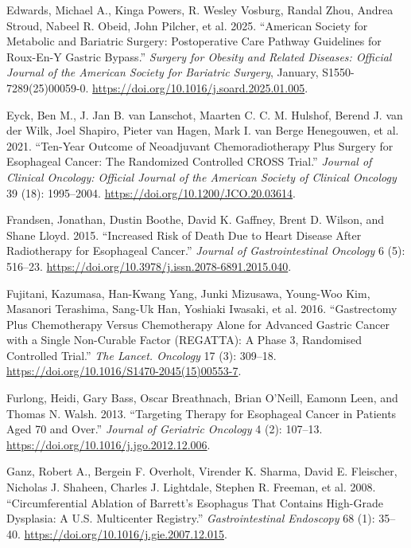 \documentclass[
  letterpaper,
]{scrbook}
\newlength{\cslhangindent}
\newenvironment{CSLReferences}[2] %
 {\begin{list}{}{%
  \setlength{\itemindent}{0pt}
  \setlength{\leftmargin}{0pt}
  \setlength{\parsep}{0pt}
  \ifodd #1
   \setlength{\leftmargin}{\cslhangindent}
   \setlength{\itemindent}{-1\cslhangindent}
  \fi
  \setlength{\itemsep}{#2\baselineskip}}}
 {\end{list}}
\begin{document}
\begin{CSLReferences}{1}{0}
Edwards, Michael A., Kinga Powers, R. Wesley Vosburg, Randal Zhou,
Andrea Stroud, Nabeel R. Obeid, John Pilcher, et al. 2025. {``American
{Society} for {Metabolic} and {Bariatric} {Surgery}: Postoperative Care
Pathway Guidelines for {Roux}-En-{Y} Gastric Bypass.''} \emph{Surgery
for Obesity and Related Diseases: Official Journal of the American
Society for Bariatric Surgery}, January, S1550-7289(25)00059-0.
\url{https://doi.org/10.1016/j.soard.2025.01.005}.

Eyck, Ben M., J. Jan B. van Lanschot, Maarten C. C. M. Hulshof, Berend
J. van der Wilk, Joel Shapiro, Pieter van Hagen, Mark I. van Berge
Henegouwen, et al. 2021. {``Ten-{Year} {Outcome} of {Neoadjuvant}
{Chemoradiotherapy} {Plus} {Surgery} for {Esophageal} {Cancer}: {The}
{Randomized} {Controlled} {CROSS} {Trial}.''} \emph{Journal of Clinical
Oncology: Official Journal of the American Society of Clinical Oncology}
39 (18): 1995--2004. \url{https://doi.org/10.1200/JCO.20.03614}.

Frandsen, Jonathan, Dustin Boothe, David K. Gaffney, Brent D. Wilson,
and Shane Lloyd. 2015. {``Increased Risk of Death Due to Heart Disease
After Radiotherapy for Esophageal Cancer.''} \emph{Journal of
Gastrointestinal Oncology} 6 (5): 516--23.
\url{https://doi.org/10.3978/j.issn.2078-6891.2015.040}.

Fujitani, Kazumasa, Han-Kwang Yang, Junki Mizusawa, Young-Woo Kim,
Masanori Terashima, Sang-Uk Han, Yoshiaki Iwasaki, et al. 2016.
{``Gastrectomy Plus Chemotherapy Versus Chemotherapy Alone for Advanced
Gastric Cancer with a Single Non-Curable Factor ({REGATTA}): A Phase 3,
Randomised Controlled Trial.''} \emph{The Lancet. Oncology} 17 (3):
309--18. \url{https://doi.org/10.1016/S1470-2045(15)00553-7}.

Furlong, Heidi, Gary Bass, Oscar Breathnach, Brian O'Neill, Eamonn Leen,
and Thomas N. Walsh. 2013. {``Targeting Therapy for Esophageal Cancer in
Patients Aged 70 and Over.''} \emph{Journal of Geriatric Oncology} 4
(2): 107--13. \url{https://doi.org/10.1016/j.jgo.2012.12.006}.

Ganz, Robert A., Bergein F. Overholt, Virender K. Sharma, David E.
Fleischer, Nicholas J. Shaheen, Charles J. Lightdale, Stephen R.
Freeman, et al. 2008. {``Circumferential Ablation of {Barrett}'s
Esophagus That Contains High-Grade Dysplasia: A {U}.{S}. {Multicenter}
{Registry}.''} \emph{Gastrointestinal Endoscopy} 68 (1): 35--40.
\url{https://doi.org/10.1016/j.gie.2007.12.015}.


\end{CSLReferences}
\end{document}
